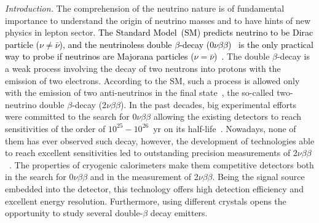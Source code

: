 \documentclass[%
reprint,
superscriptaddress,
altaffilletter,
showpacs,
showkeys,
amsmath, amssymb, aps,prl, floatfix,
]{revtex4-1}
\newcommand{\HalfLifenewred}{T_{1/2}^{2\nu} = [8.69 \pm 0.05 \textrm{(stat.)}~^{+0.09}_{-0.06} \textrm{(syst.)}] \times 10^{19}~\textrm{yr}}
\newcommand{\se}{$^{82}$Se\xspace}
\newcommand{\mo}{$^{100}$Mo\xspace}
\newcommand{\onu}{$0\nu\beta \beta$\xspace}
\newcommand{\vv}{2$\nu\beta\beta$\xspace}
\begin{document}
\date{\today}

\begin{abstract}
We report on the results obtained with the global CUPID-0 background model, which combines the data collected in the two measurement campaigns for a total exposure of 8.82~kg$\times$yr of $^{82}$Se. 
We identify with improved precision the background sources within the 3 MeV energy region, where neutrinoless double $\beta$-decay of \se and \mo is expected, making more solid the foundations for the background budget of the next-generation CUPID experiment. Relying on the excellent data reconstruction, we measure the two-neutrino double $\beta$-decay half-life of $^{82}$Se with unprecedented accuracy:
$\HalfLifenewred$.
\end{abstract}

\maketitle
{\it Introduction.} The comprehension of the neutrino nature is of fundamental importance to understand the origin of neutrino masses and to have hints of new physics in lepton sector. \textcolor{black}{The Standard Model~(SM) predicts neutrino to be Dirac particle ($\nu \neq\bar{\nu}$), and the neutrinoless double $\beta$-decay (\onu)~\cite{Furry:1939qr} is the only practical way to probe if neutrinos are Majorana particles ($\nu=\bar{\nu}$)~\cite{DellOro:2016tmg}.} The double $\beta$-decay is a weak process involving the decay of two neutrons into protons with the emission of two electrons. According to the SM, such a process is allowed only with the emission of two anti-neutrinos in the final state~\cite{GoeppertMayer}, the so-called two-neutrino double $\beta$-decay (\vv). In the past decades, big experimental efforts were committed to the search for \onu allowing the existing detectors to reach sensitivities of the order of $10^{25}-10^{26}$~yr on its half-life~\cite{GERDA:2020xhi,KamLAND-Zen:2022tow,CUORE:2021mvw}. Nowadays, none of them has ever observed such decay, however, the development of technologies able to reach excellent sensitivities led to outstanding precision measurements of \vv~\cite{Saakyan:2013yna,Barabash:2015eza,NEXT:2021dqj,GERDA:2023wbr,KamLAND-Zen:2019imh,CUORE:2020bok,CUPID-Mo:2023lru,NEMO-3:2019gwo}. 
The properties of cryogenic calorimeters make them competitive detectors both in the search for \onu and in the measurement of \vv. Being the signal source embedded into the detector, this technology offers high detection efficiency and excellent energy resolution. Furthermore, using different crystals opens the opportunity to study several double-$\beta$ decay emitters. 
\end{document}
